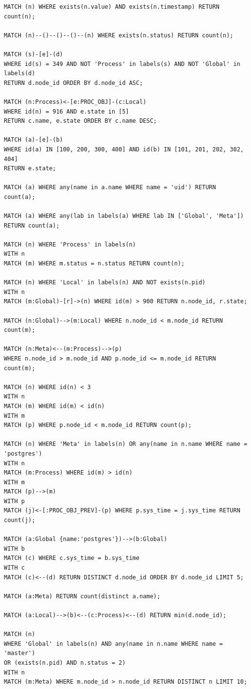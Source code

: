 \documentclass[letterpaper]{ltxdoc}
\begin{document}
\begin{verbatim}
MATCH (n) WHERE exists(n.value) AND exists(n.timestamp) RETURN count(n);

MATCH (n)--()--()--()--(n) WHERE exists(n.status) RETURN count(n);

MATCH (s)-[e]-(d)
WHERE id(s) = 349 AND NOT 'Process' in labels(s) AND NOT 'Global' in labels(d)
RETURN d.node_id ORDER BY d.node_id ASC;

MATCH (n:Process)<-[e:PROC_OBJ]-(c:Local)
WHERE id(n) = 916 AND e.state in [5]
RETURN c.name, e.state ORDER BY c.name DESC;

MATCH (a)-[e]-(b)
WHERE id(a) IN [100, 200, 300, 400] AND id(b) IN [101, 201, 202, 302, 404]
RETURN e.state;

MATCH (a) WHERE any(name in a.name WHERE name = 'uid') RETURN count(a);

MATCH (a) WHERE any(lab in labels(a) WHERE lab IN ['Global', 'Meta'])
RETURN count(a);

MATCH (n) WHERE 'Process' in labels(n)
WITH n
MATCH (m) WHERE m.status = n.status RETURN count(n);

MATCH (n) WHERE 'Local' in labels(n) AND NOT exists(n.pid)
WITH n
MATCH (m:Global)-[r]->(n) WHERE id(m) > 900 RETURN n.node_id, r.state;

MATCH (n:Global)-->(m:Local) WHERE n.node_id < m.node_id RETURN count(m);

MATCH (n:Meta)<--(m:Process)-->(p)
WHERE n.node_id > m.node_id AND p.node_id <= m.node_id RETURN count(m);

MATCH (n) WHERE id(n) < 3
WITH n
MATCH (m) WHERE id(m) < id(n)
WITH m
MATCH (p) WHERE p.node_id < m.node_id RETURN count(p);

MATCH (n) WHERE 'Meta' in labels(n) OR any(name in n.name WHERE name = 'postgres')
WITH n
MATCH (m:Process) WHERE id(m) > id(n)
WITH m
MATCH (p)-->(m)
WITH p
MATCH (j)<-[:PROC_OBJ_PREV]-(p) WHERE p.sys_time = j.sys_time RETURN count(j);

MATCH (a:Global {name:'postgres'})-->(b:Global)
WITH b
MATCH (c) WHERE c.sys_time = b.sys_time
WITH c
MATCH (c)<--(d) RETURN DISTINCT d.node_id ORDER BY d.node_id LIMIT 5;

MATCH (a:Meta) RETURN count(distinct a.name);

MATCH (a:Local)-->(b)<--(c:Process)<--(d) RETURN min(d.node_id);

MATCH (n)
WHERE 'Global' in labels(n) AND any(name in n.name WHERE name = 'master')
OR (exists(n.pid) AND n.status = 2)
WITH n
MATCH (m:Meta) WHERE m.node_id > n.node_id RETURN DISTINCT n LIMIT 10;


\end{verbatim}
\end{document}

